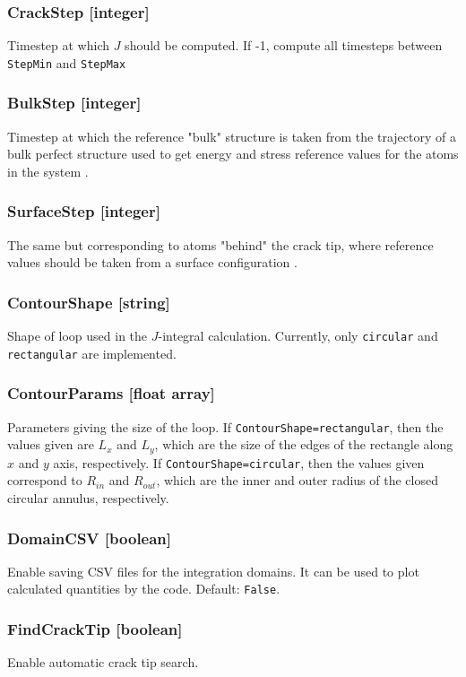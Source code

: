 \documentclass{ol-softwaremanual}
\begin{document}
\subsubsection*{CrackStep [integer]}
Timestep at which $J$ should be computed. If -1, compute all timesteps between \verb|StepMin| and \verb|StepMax|

\subsubsection*{BulkStep [integer]}
Timestep at which the reference "bulk" structure is taken from the trajectory of a bulk perfect structure used to get energy and stress reference values for the atoms in the system \cite{Nakatani_2000}.

\subsubsection*{SurfaceStep [integer]}
The same but corresponding to atoms "behind" the crack tip, where reference values should be taken from a surface configuration \cite{Nakatani_2000}.

\subsubsection*{ContourShape [string]}
Shape of loop used in the $J$-integral calculation. Currently, only \verb|circular| and \verb|rectangular| are implemented.

\subsubsection*{ContourParams [float array]}
Parameters giving the size of the loop. If \verb|ContourShape=rectangular|, then the values given are $L_x$ and $L_y$, which are the size of the edges of the rectangle along $x$ and $y$ axis, respectively. If \verb|ContourShape=circular|, then the values given correspond to $R_{in}$ and $R_{out}$, which are the inner and outer radius of the closed circular annulus, respectively.

\subsubsection*{DomainCSV [boolean]}
Enable saving CSV files for the integration domains. It can be used to plot calculated quantities by the code. Default: \verb|False|.

\subsubsection*{FindCrackTip [boolean]}
Enable automatic crack tip search. 
\end{document}
